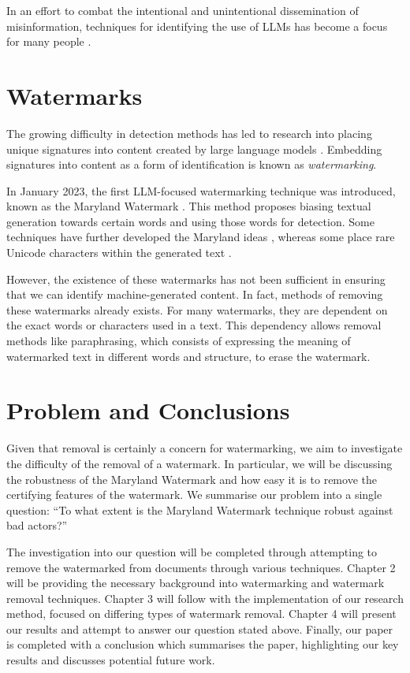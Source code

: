 \documentclass{l4proj}
\theoremstyle{definition}
\begin{document}
        In an effort to combat the intentional and unintentional dissemination of misinformation, techniques for identifying the use of LLMs has become a focus for many people \citep{kirchenbauer2023watermark, mitchell2023detectgpt, grinbaum2022ethical}. 

    \section{Watermarks}
        The growing difficulty in detection methods \citep{sadasivan2023aigenerated} has led to research into placing unique signatures into content created by large language models \citep{openAIclassifier}. Embedding signatures into content as a form of identification is known as \emph{watermarking}. 

        In January 2023, the first LLM-focused watermarking technique was introduced, known as the Maryland Watermark \citep{kirchenbauer2023watermark}. This method proposes biasing textual generation towards certain words and using those words for detection. Some techniques have further developed the Maryland ideas \citep{liu2024semantic}, whereas some place rare Unicode characters within the generated text \citep{sato2023embarrassingly}.

        However, the existence of these watermarks has not been sufficient in ensuring that we can identify machine-generated content. In fact, methods of removing these watermarks already exists. For many watermarks, they are dependent on the exact words or characters used in a text. This dependency allows removal methods like paraphrasing, which consists of expressing the meaning of watermarked text in different words and structure, to erase the watermark.
        
    \section{Problem and Conclusions}
        Given that removal is certainly a concern for watermarking, we aim to investigate the difficulty of the removal of a watermark. In particular, we will be discussing the robustness of the Maryland Watermark and how easy it is to remove the certifying features of the watermark. We summarise our problem into a single question: ``To what extent is the Maryland Watermark technique robust against bad actors?''

        The investigation into our question will be completed through attempting to remove the watermarked from documents through various techniques. Chapter 2 will be providing the necessary background into watermarking and watermark removal techniques. Chapter 3 will follow with the implementation of our research method, focused on differing types of watermark removal. Chapter 4 will present our results and attempt to answer our question stated above. Finally, our paper is completed with a conclusion which summarises the paper, highlighting our key results and discusses potential future work.
\end{document}
